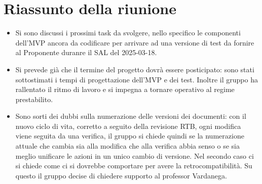 \section{Riassunto della riunione}

\begin{itemize}
    \item Si sono discussi i prossimi task da svolgere, nello specifico le componenti dell'MVP ancora da codificare per arrivare ad una versione di test da fornire al Proponente duranre il SAL del 2025-03-18.
    \item Si prevede già che il termine del progetto dovrà essere posticipato: sono stati sottostimati i tempi di progettazione dell'MVP e dei test. Inoltre il gruppo ha rallentato il ritmo di lavoro e si impegna a tornare operativo al regime prestabilito.
    
    \item Sono sorti dei dubbi sulla numerazione delle versioni dei documenti: con il nuovo ciclo di vita, corretto a seguito della revisione RTB, ogni modifica viene seguita da una verifica, il gruppo si chiede quindi se la numerazione attuale che cambia sia alla modifica che alla verifica abbia senso o se sia meglio unificare le azioni in un unico cambio di versione. Nel secondo caso ci si chiede come  ci si dovrebbe comportare per avere la retrocompatibilità. Su questo il gruppo decise di chiedere supporto al professor Vardanega.
    

\end{itemize}

